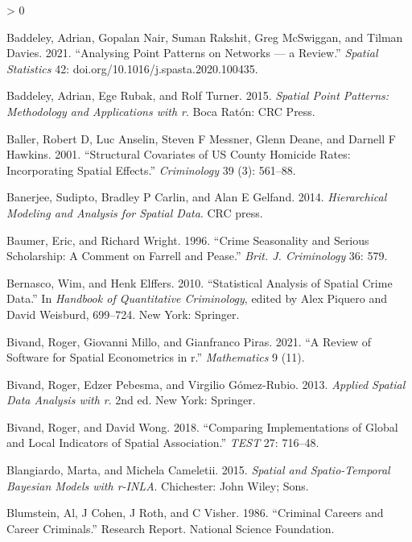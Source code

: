 \documentclass[
  krantz2]{krantz}
\newlength{\cslhangindent}
\newenvironment{CSLReferences}[2] %
 {%
  \setlength{\parindent}{0pt}
  \ifodd #1 \everypar{\setlength{\hangindent}{\cslhangindent}}\ignorespaces\fi
  \ifnum #2 > 0
  \setlength{\parskip}{#2\baselineskip}
  \fi
 }%
 {}
\begin{document}
\begin{CSLReferences}{1}{0}
\leavevmode\hypertarget{ref-Baddeley_2021}{}%
Baddeley, Adrian, Gopalan Nair, Suman Rakshit, Greg McSwiggan, and Tilman Davies. 2021. {``Analysing Point Patterns on Networks --- a Review.''} \emph{Spatial Statistics} 42: doi.org/10.1016/j.spasta.2020.100435.

\leavevmode\hypertarget{ref-Baddeley_2016}{}%
Baddeley, Adrian, Ege Rubak, and Rolf Turner. 2015. \emph{Spatial Point Patterns: Methodology and Applications with r}. Boca Ratón: CRC Press.

\leavevmode\hypertarget{ref-Baller_2001}{}%
Baller, Robert D, Luc Anselin, Steven F Messner, Glenn Deane, and Darnell F Hawkins. 2001. {``Structural Covariates of US County Homicide Rates: Incorporating Spatial Effects.''} \emph{Criminology} 39 (3): 561--88.

\leavevmode\hypertarget{ref-Banerjee_2014}{}%
Banerjee, Sudipto, Bradley P Carlin, and Alan E Gelfand. 2014. \emph{Hierarchical Modeling and Analysis for Spatial Data}. CRC press.

\leavevmode\hypertarget{ref-Baumer_1996}{}%
Baumer, Eric, and Richard Wright. 1996. {``Crime Seasonality and Serious Scholarship: A Comment on Farrell and Pease.''} \emph{Brit. J. Criminology} 36: 579.

\leavevmode\hypertarget{ref-Bernasco_2010}{}%
Bernasco, Wim, and Henk Elffers. 2010. {``Statistical Analysis of Spatial Crime Data.''} In \emph{Handbook of Quantitative Criminology}, edited by Alex Piquero and David Weisburd, 699--724. New York: Springer.

\leavevmode\hypertarget{ref-Bivand_2021}{}%
Bivand, Roger, Giovanni Millo, and Gianfranco Piras. 2021. {``A Review of Software for Spatial Econometrics in r.''} \emph{Mathematics} 9 (11).

\leavevmode\hypertarget{ref-Bivand_2013}{}%
Bivand, Roger, Edzer Pebesma, and Virgilio Gómez-Rubio. 2013. \emph{Applied Spatial Data Analysis with r}. 2nd ed. New York: Springer.

\leavevmode\hypertarget{ref-Bivand_2018}{}%
Bivand, Roger, and David Wong. 2018. {``Comparing Implementations of Global and Local Indicators of Spatial Association.''} \emph{TEST} 27: 716--48.

\leavevmode\hypertarget{ref-Blangiardo_2015}{}%
Blangiardo, Marta, and Michela Cameletii. 2015. \emph{Spatial and Spatio-Temporal Bayesian Models with r-INLA}. Chichester: John Wiley; Sons.

\leavevmode\hypertarget{ref-Blumstein_1986}{}%
Blumstein, Al, J Cohen, J Roth, and C Visher. 1986. {``Criminal Careers and Career Criminals.''} Research Report. National Science Foundation.


\end{CSLReferences}
\end{document}

